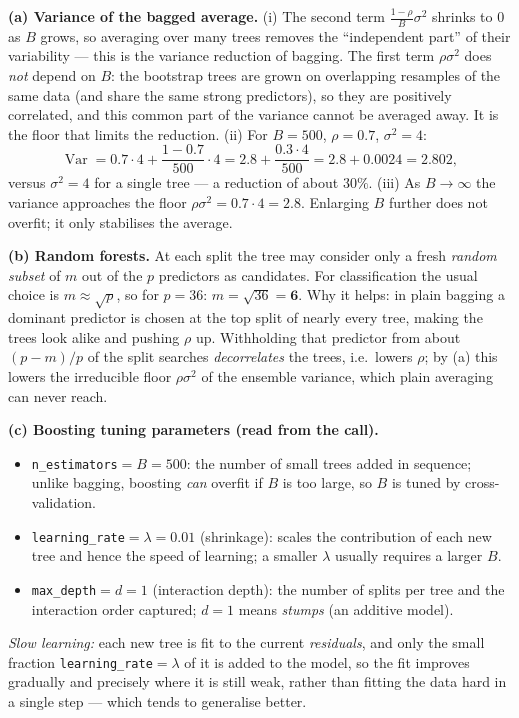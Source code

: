 \documentclass[11pt,a4paper]{article}
\begin{document}
\ifdefined\withsolutions
\begin{solutionbox}
\textbf{(a) Variance of the bagged average.}
(i) The second term $\frac{1-\rho}{B}\sigma^2$ shrinks to $0$ as $B$ grows, so averaging over
many trees removes the ``independent part'' of their variability --- this is the variance
reduction of bagging. The first term $\rho\sigma^2$ does \emph{not} depend on $B$: the
bootstrap trees are grown on overlapping resamples of the same data (and share the same strong
predictors), so they are positively correlated, and this common part of the variance cannot be
averaged away. It is the floor that limits the reduction.
(ii) For $B=500$, $\rho=0.7$, $\sigma^2=4$:
\[
  \operatorname{Var}=0.7\cdot 4+\frac{1-0.7}{500}\cdot 4
  =2.8+\frac{0.3\cdot 4}{500}=2.8+0.0024=\mathbf{2.802},
\]
versus $\sigma^2=4$ for a single tree --- a reduction of about $30\%$.
(iii) As $B\to\infty$ the variance approaches the floor $\rho\sigma^2=0.7\cdot 4=\mathbf{2.8}$.
Enlarging $B$ further does not overfit; it only stabilises the average.

\medskip
\textbf{(b) Random forests.}
At each split the tree may consider only a fresh \emph{random subset} of $m$ out of the $p$
predictors as candidates. For classification the usual choice is $m\approx\sqrt{p}$, so for
$p=36$: $m=\sqrt{36}=\mathbf{6}$.
Why it helps: in plain bagging a dominant predictor is chosen at the top split of nearly every
tree, making the trees look alike and pushing $\rho$ up. Withholding that predictor from about
$(p-m)/p$ of the split searches \emph{decorrelates} the trees, i.e.\ lowers $\rho$; by (a) this
lowers the irreducible floor $\rho\sigma^2$ of the ensemble variance, which plain averaging can
never reach.

\medskip
\textbf{(c) Boosting tuning parameters (read from the call).}
\begin{itemize}[nosep,leftmargin=5mm]
  \item \texttt{n\_estimators}$=B=500$: the number of small trees added in sequence; unlike
    bagging, boosting \emph{can} overfit if $B$ is too large, so $B$ is tuned by cross-validation.
  \item \texttt{learning\_rate}$=\lambda=0.01$ (shrinkage): scales the contribution of each new
    tree and hence the speed of learning; a smaller $\lambda$ usually requires a larger $B$.
  \item \texttt{max\_depth}$=d=1$ (interaction depth): the number of splits per tree and the
    interaction order captured; $d=1$ means \emph{stumps} (an additive model).
\end{itemize}
\emph{Slow learning:} each new tree is fit to the current \emph{residuals}, and only the small
fraction \texttt{learning\_rate}$=\lambda$ of it is added to the model, so the fit improves
gradually and precisely where it is still weak, rather than fitting the data hard in a single
step --- which tends to generalise better.


\end{solutionbox}
\end{document}

